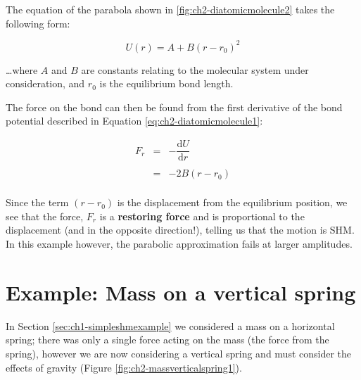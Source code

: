\documentclass[
]{book}
\begin{document}
The equation of the parabola shown in \ref{fig:ch2-diatomicmolecule2} takes the following form:

\begin{equation}
U(r) = A + B(r - r_0)^2
\label{eq:ch2-diatomicmolecule1}
\end{equation}

\ldots where \(A\) and \(B\) are constants relating to the molecular system under consideration, and \(r_0\) is the equilibrium bond length.

The force on the bond can then be found from the first derivative of the bond potential described in Equation \eqref{eq:ch2-diatomicmolecule1}:

\begin{equation}
\begin{array}{rcl}
F_r &=& - \dfrac{\mathrm{d}U}{\mathrm{d}r} \\
\\
&=& -2B(r-r_0)\\
\end{array}
\label{eq:ch2-diatomicmolecule2}
\end{equation}

Since the term \((r-r_0)\) is the displacement from the equilibrium position, we see that the force, \(F_r\) is a \textbf{restoring force} and is proportional to the displacement (and in the opposite direction!), telling us that the motion is SHM. In this example however, the parabolic approximation fails at larger amplitudes.

\hypertarget{sec:ch2-massverticalspring}{%
\section{Example: Mass on a vertical spring}\label{sec:ch2-massverticalspring}}

In Section \ref{sec:ch1-simpleshmexample} we considered a mass on a horizontal spring; there was only a single force acting on the mass (the force from the spring), however we are now considering a vertical spring and must consider the effects of gravity (Figure \ref{fig:ch2-massverticalspring1}).
\end{document}
